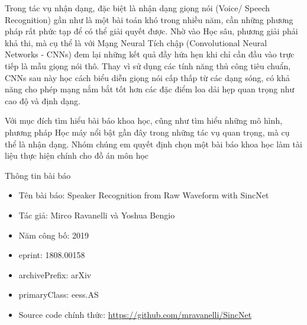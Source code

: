 \documentclass{article}
\begin{document}
	Trong tác vụ nhận dạng, đặc biệt là nhận dạng giọng nói (Voice/ Speech Recognition) gần như là một bài toán khó trong nhiều năm, cần những phương pháp rất phức tạp để có thể giải quyết được. Nhờ vào Học sâu, phương giải phải khả thi, mà cụ thể là với Mạng Neural Tích chập (Convolutional Neural Networks - CNNs) đem lại những kết quả đầy hứa hẹn khi chỉ cần đầu vào trực tiếp là mẫu giọng nói thô. Thay vì sử dụng các tính năng thủ công tiêu chuẩn, CNNs sau này học cách biểu diễn giọng nói cấp thấp từ các dạng sóng, có khả năng cho phép mạng nắm bắt tốt hơn các đặc điểm loa dải hẹp quan trọng như cao độ và định dạng.
	
	Với mục đích tìm hiểu bài báo khoa học, cũng như tìm hiểu những mô hình, phương pháp Học máy nổi bật gần đây trong những tác vụ quan trọng, mà cụ thể là nhận dạng. Nhóm chúng em quyết định chọn một bài báo khoa học làm tài liệu thực hiện chính cho đồ án môn học
	
	Thông tin bài báo
	\begin{itemize}
		\item Tên bài báo: Speaker Recognition from Raw Waveform with SincNet
		
		\item Tác giả: Mirco Ravanelli và Yoshua Bengio
		
		\item Năm công bố: 2019
		
		\item eprint: 1808.00158
		
		\item archivePrefix: arXiv
		
		\item primaryClass: eess.AS
		
		\item Source code chính thức: \href{https://github.com/mravanelli/SincNet}{https://github.com/mravanelli/SincNet}
	\end{itemize}
\end{document}
